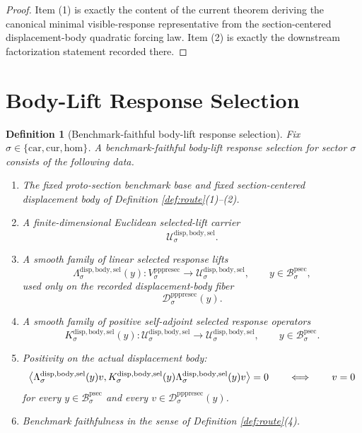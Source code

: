\documentclass[11pt]{article}
\newcommand{\Car}{\mathrm{car}}
\newcommand{\Cur}{\mathrm{cur}}
\newcommand{\Hom}{\mathrm{hom}}
\newcommand{\ProtoSectionBody}[1]{\mathcal B_{#1}^{\mathrm{psec}}}
\newcommand{\PrePreProtoSectionVertical}[1]{V_{#1}^{\mathrm{pppresec}}}
\newcommand{\PrePreProtoSectionResidualBody}[1]{\mathcal D_{#1}^{\mathrm{pppresec}}}
\newcommand{\LiftSelectionCarrier}[1]{\mathcal U_{#1}^{\mathrm{disp,body,sel}}}
\newcommand{\SelectedResponseLift}[1]{\Lambda_{#1}^{\mathrm{disp,body,sel}}}
\newcommand{\SelectedResponseOperator}[1]{K_{#1}^{\mathrm{disp,body,sel}}}
\newtheorem{definition}{Definition}
\begin{document}
\begin{proof}
Item (1) is exactly the content of the current theorem deriving the canonical minimal visible-response representative from the section-centered displacement-body quadratic forcing law. Item (2) is exactly the downstream factorization statement recorded there.
\end{proof}

\section{Body-Lift Response Selection}

\begin{definition}[Benchmark-faithful body-lift response selection]
\label{def:selection}
Fix \(\sigma\in\{\Car,\Cur,\Hom\}\). A \emph{benchmark-faithful body-lift response selection} for sector \(\sigma\) consists of the following data.
\begin{enumerate}
    \item The fixed proto-section benchmark base and fixed section-centered displacement body of Definition \ref{def:route}(1)--(2).
    \item A finite-dimensional Euclidean selected-lift carrier
    \[
    \LiftSelectionCarrier{\sigma}.
    \]
    \item A smooth family of linear selected response lifts
    \[
    \SelectedResponseLift{\sigma}(y):
    \PrePreProtoSectionVertical{\sigma}\to\LiftSelectionCarrier{\sigma},
    \qquad
    y\in\ProtoSectionBody{\sigma},
    \]
    used only on the recorded displacement-body fiber
    \[
    \PrePreProtoSectionResidualBody{\sigma}(y).
    \]
    \item A smooth family of positive self-adjoint selected response operators
    \[
    \SelectedResponseOperator{\sigma}(y):
    \LiftSelectionCarrier{\sigma}\to\LiftSelectionCarrier{\sigma},
    \qquad
    y\in\ProtoSectionBody{\sigma}.
    \]
    \item Positivity on the actual displacement body:
    \[
    \ev{
    \SelectedResponseLift{\sigma}(y)v,
    \SelectedResponseOperator{\sigma}(y)\SelectedResponseLift{\sigma}(y)v
    }
    =0
    \qquad\Longleftrightarrow\qquad
    v=0
    \]
    for every \(y\in\ProtoSectionBody{\sigma}\) and every \(v\in\PrePreProtoSectionResidualBody{\sigma}(y)\).
    \item Benchmark faithfulness in the sense of Definition \ref{def:route}(4).
\end{enumerate}
\end{definition}
\end{document}
